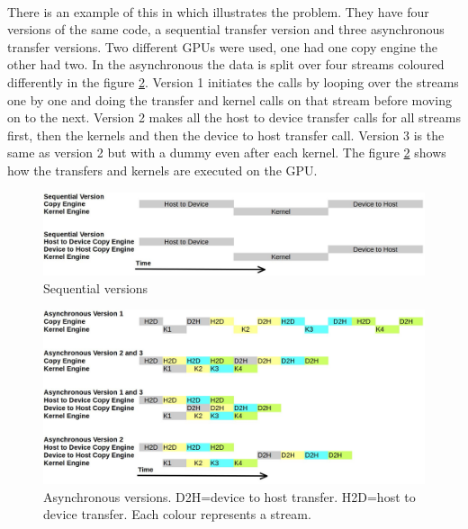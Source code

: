 \documentclass[10pt,a4paper]{report}
\newcounter{example}
\begin{document}
\\
There is an example of this in \cite{cuda_fortran_overlap} which illustrates the problem. They have four versions of the same code, a sequential transfer version and three asynchronous transfer versions. Two different GPUs were used, one had one copy engine the other had two. In the asynchronous the data is split over four streams coloured differently in the figure \ref{fig:ascynchronous}. Version 1 initiates the calls by looping over the streams one by one and doing the transfer and kernel calls on that stream before moving on to the next\cite{cuda_fortran_overlap}. Version 2 makes all the host to device transfer calls for all streams first, then the kernels and then the device to host transfer call\cite{cuda_fortran_overlap}. Version 3 is the same as version 2 but with a dummy even after each kernel\cite{cuda_fortran_overlap}. The figure \ref{fig:ascynchronous} shows how the transfers and kernels are executed on the GPU.

\begin{figure}[h]
    \centering
    \includegraphics[width=12cm]{streams_seq.jpg}
    \caption{Sequential versions}
    \label{fig:sequential}
\end{figure}

\begin{figure}[h]
    \centering
    \includegraphics[width=12cm]{streams_async.jpg}
    \caption{Asynchronous versions. D2H=device to host transfer. H2D=host to device transfer. Each colour represents a stream.}
    \label{fig:ascynchronous}
\end{figure}
\end{document}

